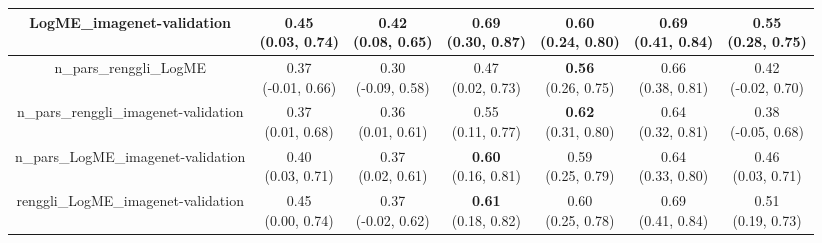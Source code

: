 \begin{table}[H]
\begin{tabular}{c|cccccc}
\hline
LogME_imagenet-validation & \makecell{0.45 \\[0pt] (0.03, 0.74)} & \makecell{0.42 \\[0pt] (0.08, 0.65)} & \makecell{\textbf{0.69} \\[0pt] (0.30, 0.87)} & \makecell{0.60 \\[0pt] (0.24, 0.80)} & \makecell{0.69 \\[0pt] (0.41, 0.84)} & \makecell{0.55 \\[0pt] (0.28, 0.75)} \\
\hline
n_pars_renggli_LogME & \makecell{0.37 \\[0pt] (-0.01, 0.66)} & \makecell{0.30 \\[0pt] (-0.09, 0.58)} & \makecell{0.47 \\[0pt] (0.02, 0.73)} & \makecell{\textbf{0.56} \\[0pt] (0.26, 0.75)} & \makecell{0.66 \\[0pt] (0.38, 0.81)} & \makecell{0.42 \\[0pt] (-0.02, 0.70)} \\
\hline
n_pars_renggli_imagenet-validation & \makecell{0.37 \\[0pt] (0.01, 0.68)} & \makecell{0.36 \\[0pt] (0.01, 0.61)} & \makecell{0.55 \\[0pt] (0.11, 0.77)} & \makecell{\textbf{0.62} \\[0pt] (0.31, 0.80)} & \makecell{0.64 \\[0pt] (0.32, 0.81)} & \makecell{0.38 \\[0pt] (-0.05, 0.68)} \\
\hline
n_pars_LogME_imagenet-validation & \makecell{0.40 \\[0pt] (0.03, 0.71)} & \makecell{0.37 \\[0pt] (0.02, 0.61)} & \makecell{\textbf{0.60} \\[0pt] (0.16, 0.81)} & \makecell{0.59 \\[0pt] (0.25, 0.79)} & \makecell{0.64 \\[0pt] (0.33, 0.80)} & \makecell{0.46 \\[0pt] (0.03, 0.71)} \\
\hline
renggli_LogME_imagenet-validation & \makecell{0.45 \\[0pt] (0.00, 0.74)} & \makecell{0.37 \\[0pt] (-0.02, 0.62)} & \makecell{\textbf{0.61} \\[0pt] (0.18, 0.82)} & \makecell{0.60 \\[0pt] (0.25, 0.78)} & \makecell{0.69 \\[0pt] (0.41, 0.84)} & \makecell{0.51 \\[0pt] (0.19, 0.73)} \\

\end{tabular}
\end{table}
